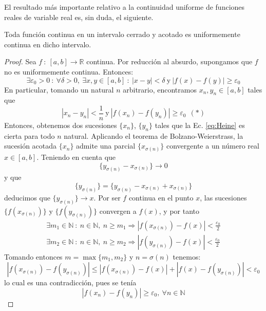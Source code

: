 El resultado más importante relativo a la continuidad uniforme de funciones reales de variable real es, sin duda, el siguiente.
\begin{teo}[de Heine]
    Toda función continua en un intervalo cerrado y acotado es uniformemente continua en dicho intervalo.
\end{teo}
\begin{proof}
    Sea $f ~:~ [a,b] \longrightarrow \mathbb{R}$ continua. Por reducción al absurdo, supongamos que $f$ no es uniformemente continua.
    Entonces:
    \begin{equation*}
        \exists \varepsilon_0 > 0 ~:~ \forall \delta > 0, ~ \exists x,y \in [a,b] ~:~ |x-y| < \delta ~ \text{y} ~ |f(x)-f(y)| \geq \varepsilon_0
    \end{equation*}
    En particular, tomando un natural $n$ arbitrario, encontramos $x_n, y_n \in [a,b]$ tales que
    \begin{equation}\label{eq:Heine}
        |x_n - y_n| < \frac{1}{n} ~ \text{y} ~ |f(x_n)-f(y_n)| \geq \varepsilon_0 ~~ (*)
    \end{equation}
    Entonces, obtenemos dos sucesiones $\{x_n\}$, $\{y_n\}$ tales que la Ec. \ref{eq:Heine} es cierta para todo $n$ natural. Aplicando el
    teorema de Bolzano-Weierstrass, la sucesión acotada $\{x_n\}$ admite una parcial $\{x_{\sigma(n)}\}$ convergente
    a un número real $x \in [a,b]$. Teniendo en cuenta que
    \begin{equation*}
        \{y_{\sigma(n)} - x_{\sigma(n)}\} \longrightarrow 0
    \end{equation*}
    y que
    \begin{equation*}
        \{y_{\sigma(n)}\} = \{y_{\sigma(n)} - x_{\sigma(n)} + x_{\sigma(n)}\}
    \end{equation*}
    deducimos que $\{y_{\sigma(n)}\} \longrightarrow x$. Por ser $f$ continua en el punto $x$, las sucesiones
    $\{f(x_{\sigma(n)})\}$ y $\{f(y_{\sigma(n)})\}$ convergen a $f(x)$, y por tanto
    \begin{gather*}
        \exists m_1 \in \mathbb{N} ~:~ n \in \mathbb{N}, ~ n \geq m_1 \Longrightarrow |f(x_{\sigma(n)})-f(x)| < \frac{\varepsilon_0}{2}\\
        \exists m_2 \in \mathbb{N} ~:~ n \in \mathbb{N}, ~ n \geq m_2 \Longrightarrow |f(y_{\sigma(n)})-f(x)| < \frac{\varepsilon_0}{2}
    \end{gather*}
    Tomando entonces $m = \max \{m_1,m_2\}$ y $n = \sigma(n)$ tenemos:
    \begin{equation*}
        |f(x_{\sigma(n)})-f(y_{\sigma(n)})| \leq |f(x_{\sigma(n)})-f(x)| + |f(x)-f(y_{\sigma(n)})| < \varepsilon_0
    \end{equation*}
    lo cual es una contradicción, pues se tenía
    \begin{equation*}
        |f(x_n)-f(y_n)| \geq \varepsilon_0, ~ \forall n \in \mathbb{N}
    \end{equation*}
\end{proof}


